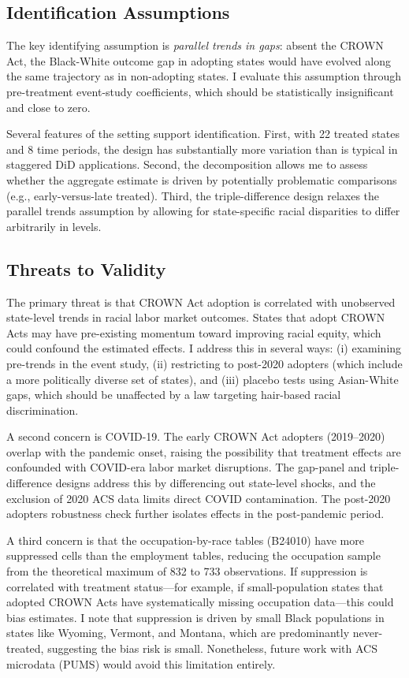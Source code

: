 \documentclass[12pt]{article}
\begin{document}
\subsection{Identification Assumptions}

The key identifying assumption is \textit{parallel trends in gaps}: absent the CROWN Act, the Black-White outcome gap in adopting states would have evolved along the same trajectory as in non-adopting states. I evaluate this assumption through pre-treatment event-study coefficients, which should be statistically insignificant and close to zero.

Several features of the setting support identification. First, with 22 treated states and 8 time periods, the design has substantially more variation than is typical in staggered DiD applications. Second, the \citet{goodmanBacon2021} decomposition allows me to assess whether the aggregate estimate is driven by potentially problematic comparisons (e.g., early-versus-late treated). Third, the triple-difference design relaxes the parallel trends assumption by allowing for state-specific racial disparities to differ arbitrarily in levels.

\subsection{Threats to Validity}

The primary threat is that CROWN Act adoption is correlated with unobserved state-level trends in racial labor market outcomes. States that adopt CROWN Acts may have pre-existing momentum toward improving racial equity, which could confound the estimated effects. I address this in several ways: (i) examining pre-trends in the event study, (ii) restricting to post-2020 adopters (which include a more politically diverse set of states), and (iii) placebo tests using Asian-White gaps, which should be unaffected by a law targeting hair-based racial discrimination.

A second concern is COVID-19. The early CROWN Act adopters (2019--2020) overlap with the pandemic onset, raising the possibility that treatment effects are confounded with COVID-era labor market disruptions. The gap-panel and triple-difference designs address this by differencing out state-level shocks, and the exclusion of 2020 ACS data limits direct COVID contamination. The post-2020 adopters robustness check further isolates effects in the post-pandemic period.

A third concern is that the occupation-by-race tables (B24010) have more suppressed cells than the employment tables, reducing the occupation sample from the theoretical maximum of 832 to 733 observations. If suppression is correlated with treatment status---for example, if small-population states that adopted CROWN Acts have systematically missing occupation data---this could bias estimates. I note that suppression is driven by small Black populations in states like Wyoming, Vermont, and Montana, which are predominantly never-treated, suggesting the bias risk is small. Nonetheless, future work with ACS microdata (PUMS) would avoid this limitation entirely.
\end{document}

